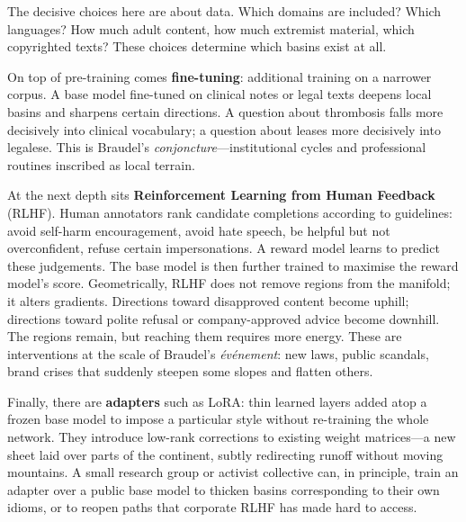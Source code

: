 \documentclass[12pt,a4paper]{article}
\begin{document}
The decisive choices here are about data. Which domains are included? Which languages? How much adult content, how much extremist material, which copyrighted texts? These choices determine which basins exist at all.

On top of pre-training comes \textbf{fine-tuning}: additional training on a narrower corpus. A base model fine-tuned on clinical notes or legal texts deepens local basins and sharpens certain directions. A question about thrombosis falls more decisively into clinical vocabulary; a question about leases more decisively into legalese. This is Braudel's \emph{conjoncture}---institutional cycles and professional routines inscribed as local terrain.

At the next depth sits \textbf{Reinforcement Learning from Human Feedback} (RLHF). Human annotators rank candidate completions according to guidelines: avoid self-harm encouragement, avoid hate speech, be helpful but not overconfident, refuse certain impersonations. A reward model learns to predict these judgements. The base model is then further trained to maximise the reward model's score. Geometrically, RLHF does not remove regions from the manifold; it alters gradients. Directions toward disapproved content become uphill; directions toward polite refusal or company-approved advice become downhill. The regions remain, but reaching them requires more energy. These are interventions at the scale of Braudel's \emph{\'{e}v\'{e}nement}: new laws, public scandals, brand crises that suddenly steepen some slopes and flatten others.

Finally, there are \textbf{adapters} such as LoRA: thin learned layers added atop a frozen base model to impose a particular style without re-training the whole network. They introduce low-rank corrections to existing weight matrices---a new sheet laid over parts of the continent, subtly redirecting runoff without moving mountains. A small research group or activist collective can, in principle, train an adapter over a public base model to thicken basins corresponding to their own idioms, or to reopen paths that corporate RLHF has made hard to access.
\end{document}

